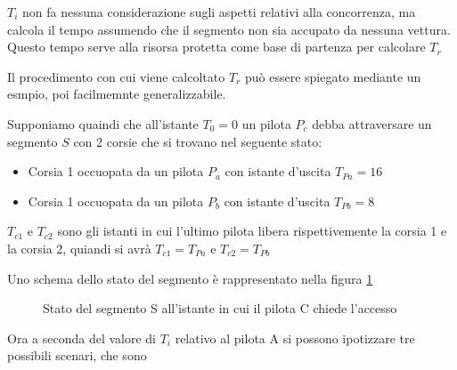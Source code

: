 \documentclass[a4paper,11pt, twoside]{book}
\begin{document}
	$T_i$ non fa nessuna considerazione sugli aspetti relativi alla concorrenza, ma calcola il tempo
	assumendo che il segmento non sia accupato da nessuna vettura. Questo tempo serve alla risorsa protetta come
	base di partenza per calcolare $T_r$
	
	Il procedimento con cui viene calcoltato $T_r$ può essere spiegato mediante un esmpio,
	poi facilmemnte generalizzabile.
	
	Supponiamo quaindi che all'istante $T_0=0$ un pilota $P_c$ debba attraversare un segmento $S$ 
	con 2 corsie che si trovano nel seguente stato:
	
	\begin{itemize}
	 \item Corsia 1 occuopata da un pilota $P_a$ con istante d'uscita $T_{Pa}=16$
	 \item Corsia 1 occuopata da un pilota $P_b$ con istante d'uscita $T_{Pb}=8$
	\end{itemize}
	
	$T_{c1}$ e $T_{c2}$ sono gli istanti in cui l'ultimo pilota libera rispettivemente la corsia 1
	e la corsia 2, quiandi si avrà $T_{c1} = T_{Pa}$ e $T_{c2} = T_{Pb}$
	
	Uno schema dello stato del segmento è rappresentato nella figura \ref{fgr:AccessoSegmentiStatoInziale}
	
	\begin{figure}[h]
	  \centering
	  \caption{Stato del segmento S all'istante in cui il pilota C chiede l'accesso}
	  \label{fgr:AccessoSegmentiStatoInziale}
	\end{figure}
	
	Ora a seconda del valore di $T_i$ relativo al pilota A si possono ipotizzare tre possibili scenari, che sono
	
\end{document}
